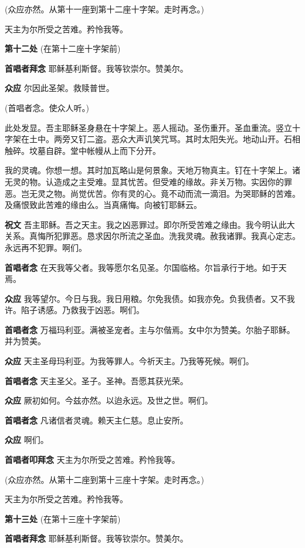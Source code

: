 \documentclass[UTF8,17pt]{ctexart}
\begin{document}
(众应亦然。从第十一座到第十二座⼗字架。⾛时再念。)

天主为尔所受之苦难。矜怜我等。

\textbf{第十二处} (在第十二座⼗字架前)

\textbf{⾸唱者拜念} \quad 耶稣基利斯督。我等钦崇尔。赞美尔。

\textbf{众应} \quad 尔因此圣架。救赎普世。

(⾸唱者念。使众⼈听。)

此处发显。吾主耶稣圣⾝悬在⼗字架上。恶⼈摇动。圣伤重开。圣⾎重流。竖⽴⼗字架在⼟中。两旁又钉⼆盗。恶众⼤声讥笑咒骂。其时太阳失光。地动⼭开。⽯相触碎。坟墓⾃辟。堂中帐幔从上⽽下分开。

我的灵魂。你想⼀想。其时加⽡略⼭是何景象。天地万物真主。钉在⼗字架上。诸⽆灵的物。认造成之主受难。显其忧苦。但受难的缘故。⾮关万物。实因你的罪恶。岂⽆灵之物。尚觉优苦。你有灵的⼼。竟不动⽽流⼀滴泪。为哭耶稣的苦难。及痛恨致此苦难的缘由么。当真痛悔。向被钉耶稣云。

\textbf{祝⽂} \quad 吾主耶稣。吾之天主。我之凶恶罪过。即尔所受苦难之缘由。我今明认此⼤关系。真悔所犯罪恶。恳求因尔所流之圣⾎。洗我灵魂。赦我诸罪。我真⼼定志。永远再不犯罪。啊们。

\textbf{⾸唱者念} \quad 在天我等⽗者。我等愿尔名见圣。尔国临格。尔旨承⾏于地。如于天焉。

\textbf{众应} \quad 我等望尔。今⽇与我。我⽇⽤粮。尔免我债。如我亦免。负我债者。又不我许。陷⼦诱感。乃救我于凶恶。啊们。

\textbf{⾸唱者念} \quad 万福玛利亚。满被圣宠者。主与尔偕焉。⼥中尔为赞美。尔胎⼦耶稣。并为赞美。

\textbf{众应} \quad 天主圣母玛利亚。为我等罪⼈。今祈天主。乃我等死候。啊们。

\textbf{⾸唱者念} \quad 天主圣⽗。圣⼦。圣神。吾愿其获光荣。

\textbf{众应} \quad 厥初如何。今兹亦然。以迨永远。及世之世。啊们。

\textbf{⾸唱者念} \quad 凡诸信者灵魂。赖天主仁慈。息⽌安所。

\textbf{众应} \quad 啊们。


\textbf{⾸唱者叩拜念} \quad 天主为尔所受之苦难。矜怜我等。

(众应亦然。从第十二座到第十三座⼗字架。⾛时再念。)

天主为尔所受之苦难。矜怜我等。

\textbf{第十三处} (在第十三座⼗字架前)

\textbf{⾸唱者拜念} \quad 耶稣基利斯督。我等钦崇尔。赞美尔。
\end{document}

